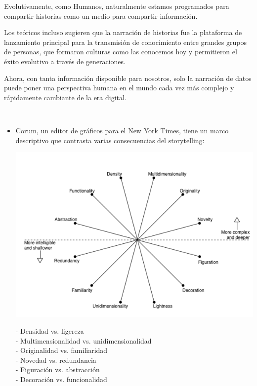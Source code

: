 {{{Evolutivamente, como Humanos, naturalmente estamos programados para compartir historias como un medio para compartir información.

Los teóricos incluso sugieren que la narración de historias fue la plataforma de lanzamiento principal para la transmisión de conocimiento entre grandes grupos de personas, que formaron culturas como las conocemos hoy y permitieron el éxito evolutivo a través de generaciones.

Ahora, con tanta información disponible para nosotros, solo la narración de datos puede poner una perspectiva humana en el mundo cada vez más complejo y rápidamente cambiante de la era digital.}

\begin{center}
\caption\textbf{EJEMPLOS BASICOS DE DATA-STORYTELLING}
\end{center}
\\
\begin{itemize}
\item  Corum, un editor de gráficos para el New York Times, tiene un marco descriptivo que contrasta varias consecuencias del storytelling:

		\begin{center}
		\includegraphics[width=15cm]{./Imagenes/Ejemplo1}
		\end{center}
		
- Densidad vs. ligereza\\
- Multimensionalidad vs. unidimensionalidad\\
- Originalidad vs. familiaridad\\
- Novedad vs. redundancia\\
- Figuración vs. abstracción\\
- Decoración vs. funcionalidad\\


\end{itemize}}}
